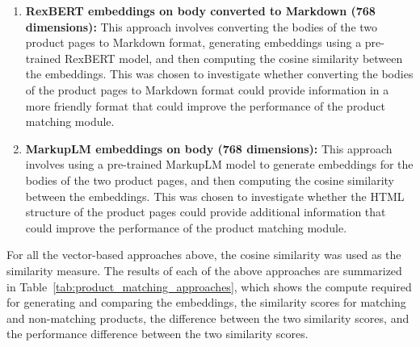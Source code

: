 \begin{enumerate}
    \item \textbf{RexBERT embeddings on body converted to Markdown (768 dimensions):} This approach involves converting the bodies of the two product pages to Markdown format, generating embeddings using a pre-trained RexBERT model, and then computing the cosine similarity between the embeddings.
    This was chosen to investigate whether converting the bodies of the product pages to Markdown format could provide information in a more friendly format that could improve the performance of the product matching module.
    \item \textbf{MarkupLM embeddings on body (768 dimensions):} This approach involves using a pre-trained MarkupLM model to generate embeddings for the bodies of the two product pages, and then computing the cosine similarity between the embeddings.
    This was chosen to investigate whether the HTML structure of the product pages could provide additional information that could improve the performance of the product matching module.
\end{enumerate}

For all the vector-based approaches above, the cosine similarity was used as the similarity measure.
The results of each of the above approaches are summarized in Table~\ref{tab:product_matching_approaches}, which shows the compute required for generating and comparing the embeddings, the similarity scores for matching and non-matching products, the difference between the two similarity scores, and the performance difference between the two similarity scores.

